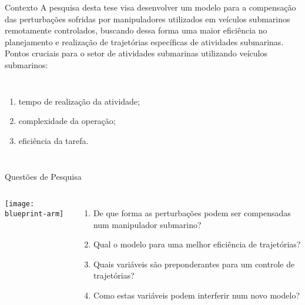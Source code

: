 \begin{frame}[t]{Contexto} 
    \transdissolve[duration=0.5]
    A pesquisa desta tese visa desenvolver um modelo para a compensação das perturbações sofridas por manipuladores utilizados em veículos submarinos remotamente controlados, buscando dessa forma uma maior eficiência no planejamento e realização de trajetórias específicas de atividades submarinas.\\
    \vspace*{0.2cm}
    Pontos cruciais para o setor de atividades submarinas utilizando veículos submarinos:
    \newline
        \begin{columns}[c]
                \begin{enumerate}
                    \item tempo de realização da atividade;
                    \item complexidade da operação;
                    \item eficiência da tarefa.
                \end{enumerate}
        \end{columns}
\end{frame}
\begin{frame}[t]{Questões de Pesquisa}
    \transboxout[duration=0.5]
    \begin{columns}
            \texttt{[image: blueprint-arm]}
            \begin{enumerate}
                \item De que forma as perturbações podem ser compensadas num manipulador submarino?
                \item Qual o modelo para uma melhor eficiência de trajetórias?
                \item Quais variáveis são preponderantes para um controle de trajetórias?
                \item Como estas variáveis podem interferir num novo modelo?
            \end{enumerate}
    \end{columns}
\end{frame}
